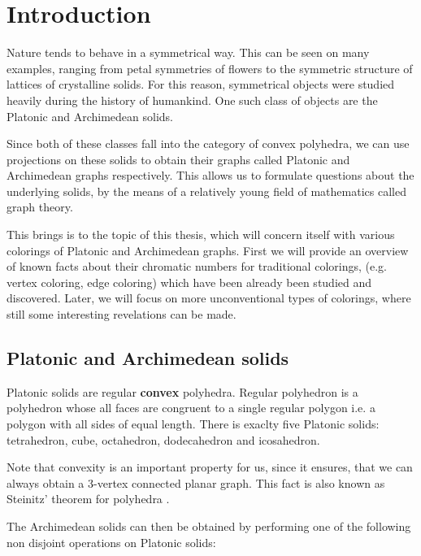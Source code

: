 \chapter*{Introduction}

Nature tends to behave in a symmetrical way. This can be seen on many examples, ranging from petal symmetries of flowers to the symmetric structure of lattices of crystalline solids. For this reason, symmetrical objects were studied heavily during the history of humankind. One such class of objects are the Platonic and Archimedean solids.

Since both of these classes fall into the category of convex polyhedra, we can use projections on these solids to obtain their graphs called Platonic and Archimedean graphs respectively. This allows us to formulate questions about the underlying solids, by the means of a relatively young field of mathematics called graph theory.

This brings is to the topic of this thesis, which will concern itself with various colorings of Platonic and Archimedean graphs. First we will provide an overview of known facts about their chromatic numbers for traditional colorings, (e.g. vertex coloring, edge coloring) which have been already been studied and discovered. Later, we will focus on more unconventional types of colorings, where still some interesting revelations can be made.

\section{Platonic and Archimedean solids}

Platonic solids are regular \textbf{convex} polyhedra. Regular polyhedron is a polyhedron whose all faces are congruent to a single regular polygon i.e. a polygon with all sides of equal length. There is exaclty five Platonic solids: tetrahedron, cube, octahedron, dodecahedron and icosahedron.

Note that convexity is an important property for us, since it ensures, that we can always obtain a 3-vertex connected planar graph. This fact is also known as Steinitz’ theorem for polyhedra \cite{kendall24}.

The Archimedean solids can then be obtained by performing one of the following non disjoint operations on Platonic solids:


